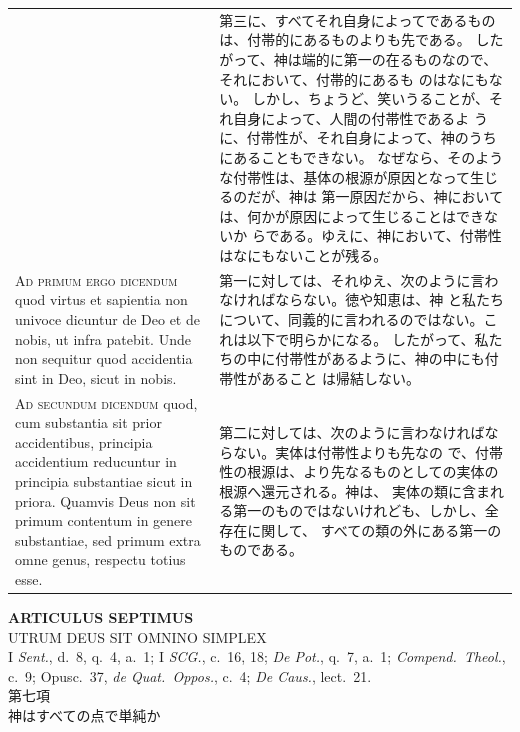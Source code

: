 \documentclass[paper=a4paper,fontsize=10pt,jafontsize=9pt,titlepage]{jlreq}
\begin{document}
\begin{longtable}{p{21em}p{21em}}
&

第三に、すべてそれ自身によってであるものは、付帯的にあるものよりも先である。
したがって、神は端的に第一の在るものなので、それにおいて、付帯的にあるも
 のはなにもない。
しかし、ちょうど、笑いうることが、それ自身によって、人間の付帯性であるよ
 うに、付帯性が、それ自身によって、神のうちにあることもできない。
なぜなら、そのような付帯性は、基体の根源が原因となって生じるのだが、神は
 第一原因だから、神においては、何かが原因によって生じることはできないか
 らである。ゆえに、神において、付帯性はなにもないことが残る。


\\

{\scshape Ad primum ergo dicendum} quod virtus et sapientia non univoce
 dicuntur de Deo et de nobis, ut infra patebit. Unde non sequitur quod
 accidentia sint in Deo, sicut in nobis.  &

第一に対しては、それゆえ、次のように言わなければならない。徳や知恵は、神
 と私たちについて、同義的に言われるのではない。これは以下で明らかになる。
 したがって、私たちの中に付帯性があるように、神の中にも付帯性があること
 は帰結しない。

\\

{\scshape Ad secundum dicendum} quod, cum substantia sit prior accidentibus,
 principia accidentium reducuntur in principia substantiae sicut in
 priora. Quamvis Deus non sit primum contentum in genere substantiae,
 sed primum extra omne genus, respectu totius esse.

&

第二に対しては、次のように言わなければならない。実体は付帯性よりも先なの
 で、付帯性の根源は、より先なるものとしての実体の根源へ還元される。神は、
 実体の類に含まれる第一のものではないけれども、しかし、全存在に関して、
 すべての類の外にある第一のものである。

 
\end{longtable}

\newpage
{}

\begin{center}
 {\Large {\bfseries ARTICULUS SEPTIMUS}}\\
 {\large UTRUM DEUS SIT OMNINO SIMPLEX}\\
 {\footnotesize I {\itshape Sent.}, d.~8, q.~4, a.~1; I {\itshape SCG.},
 c.~16, 18; {\itshape De Pot.}, q.~7, a.~1; {\itshape Compend.~Theol.},
 c.~9; Opusc.~37, {\itshape de Quat.~Oppos.}, c.~4; {\itshape De Caus.},
 lect.~21.}\\
 {\Large 第七項\\神はすべての点で単純か}
\end{center}
\end{document}
